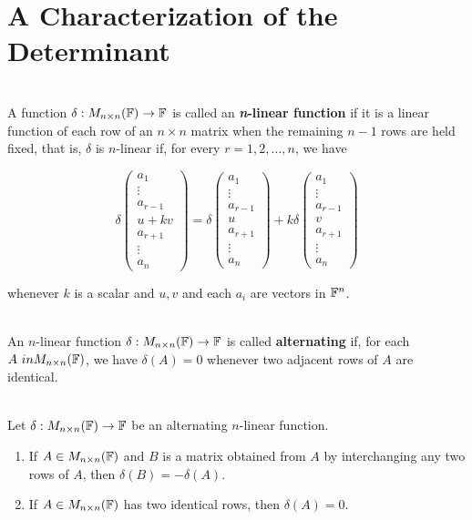 \section{A Characterization of the Determinant}

\begin{definition}
	\hfill\\
	A function $\delta: M_{n \times n}(\mathbb{F}) \to \mathbb{F}$ is called an \textbf{\textit{n}-linear function} if it is a linear function of each row of an $n \times n$ matrix when the remaining $n-1$ rows are held fixed, that is, $\delta$ is $n$-linear if, for every $r = 1, 2, \dots, n$, we have

	\[\delta\begin{pmatrix}
			a_1 \\ \vdots \\ a_{r-1} \\ u+kv \\ a_{r + 1} \\ \vdots \\ a_n
		\end{pmatrix} = \delta\begin{pmatrix}
			a_1 \\ \vdots \\ a_{r-1} \\ u \\ a_{r + 1} \\ \vdots \\ a_n
		\end{pmatrix} + k\delta\begin{pmatrix}
			a_1 \\ \vdots \\ a_{r-1} \\ v \\ a_{r+1} \\ \vdots \\ a_n
		\end{pmatrix}\]

	whenever $k$ is a scalar and $u,v$ and each $a_i$ are vectors in $\mathbb{F}^n$.
\end{definition}

\begin{definition}
	\hfill\\
	An $n$-linear function $\delta: M_{n \times n}(\mathbb{F}) \to \mathbb{F}$ is called \textbf{alternating} if, for each $A \ in M_{n \times n}(\mathbb{F})$, we have $\delta(A) = 0$ whenever two adjacent rows of $A$ are identical.
\end{definition}

\begin{theorem}
	\hfill\\
	Let $\delta: M_{n \times n}(\mathbb{F}) \to \mathbb{F}$ be an alternating $n$-linear function.

	\begin{enumerate}
		\item If $A \in M_{n \times n}(\mathbb{F})$ and $B$ is a matrix obtained from $A$ by interchanging any two rows of $A$, then $\delta(B) = -\delta(A)$.
		\item If $A \in M_{n \times n}(\mathbb{F})$ has two identical rows, then $\delta(A) = 0$.
	\end{enumerate}
\end{theorem}

